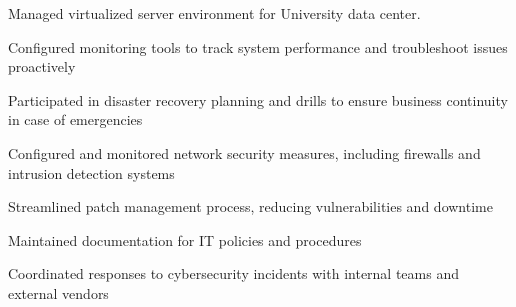 \begin{resume_list}
    \item Managed virtualized server environment for University data center.
    \item Configured monitoring tools to track system performance and troubleshoot issues proactively
    \item Participated in disaster recovery planning and drills to ensure business continuity in case of emergencies
    \item Configured and monitored network security measures, including firewalls and intrusion detection systems
    \item Streamlined patch management process, reducing vulnerabilities and downtime
    \item Maintained documentation for IT policies and procedures
    \item Coordinated responses to cybersecurity incidents with internal teams and external vendors
\end{resume_list}
